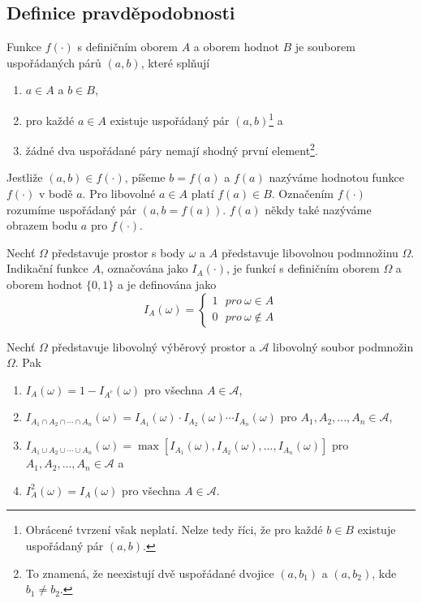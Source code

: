\subsection{Definice pravděpodobnosti}

\begin{definition}[Funkce]
Funkce $f(\cdot)$ s definičním oborem $A$ a oborem hodnot $B$ je souborem uspořádaných párů $(a, b)$, které splňují
\begin{enumerate}
\item $a \in A$ a $b \in B$,
\item pro každé $a \in A$ existuje uspořádaný pár $(a, b)$\footnote{Obrácené tvrzení však neplatí. Nelze tedy říci, že pro každé $b \in B$ existuje uspořádaný pár $(a, b)$.} a
\item žádné dva uspořádané páry nemají shodný první element\footnote{To znamená, že neexistují dvě uspořádané dvojice $(a, b_1)$ a $(a, b_2)$, kde $b_1 \not= b_2$.}.
\end{enumerate}
\end{definition}

Jestliže $(a, b) \in f(\cdot)$, píšeme $b = f(a)$ a $f(a)$ nazýváme hodnotou funkce $f(\cdot)$ v bodě $a$. Pro libovolné $a \in A$ platí $f(a) \in B$. Označením $f(\cdot)$ rozumíme uspořádaný pár $(a, b = f(a))$. $f(a)$ někdy také nazýváme obrazem bodu $a$ pro $f(\cdot)$.

\begin{definition}
Nechť $\Omega$ představuje prostor s body $\omega$ a $A$ představuje libovolnou podmnožinu $\Omega$. Indikační funkce $A$, označována jako $I_A(\cdot)$, je funkcí s definičním oborem $\Omega$ a oborem hodnot $\{0, 1\}$ a je definována jako
\begin{equation*}
I_A(\omega) = 
\begin{cases}
1~~~\textit{pro}~\omega \in A \\
0~~~\textit{pro}~\omega \notin A
\end{cases}
\end{equation*}
\end{definition}

Nechť $\Omega$ představuje libovolný výběrový prostor a $\mathscr{A}$ libovolný soubor podmnožin $\Omega$. Pak
\begin{enumerate}
\item $I_A(\omega) = 1 - I_{A^c}(\omega)$ pro všechna $A \in \mathscr{A}$,
\item $I_{A_1 \cap A_2 \cap \cdots \cap A_n}(\omega) = I_{A_1}(\omega) \cdot I_{A_2}(\omega) \cdots I_{A_n}(\omega)$ pro $A_1, A_2, ..., A_n \in \mathscr{A}$,
\item $I_{A_1 \cup A_2 \cup \cdots \cup A_n}(\omega) = \max[I_{A_1}(\omega), I_{A_2}(\omega), ..., I_{A_n}(\omega)]$ pro $A_1, A_2, ..., A_n \in \mathscr{A}$ a
\item $I^2_A(\omega) = I_A(\omega)$ pro všechna $A \in \mathscr{A}$.
\end{enumerate}

